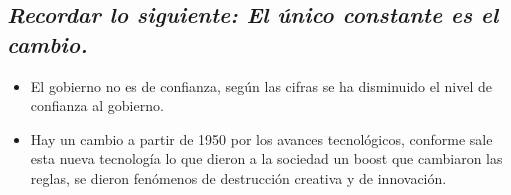 \begin{figure}[htbp]
    \centering
    \caption{}
    \label{}
\end{figure} 
\subsection{\emph{\textbf{Recordar lo siguiente: }El único constante es el cambio.}}
\begin{itemize}
    \item El gobierno no es de confianza, según las cifras se ha disminuido el nivel de confianza al gobierno.
    \item Hay un cambio a partir de 1950 por los avances tecnológicos, conforme sale esta nueva tecnología lo que dieron a la sociedad un boost que cambiaron las reglas, se dieron fenómenos de destrucción creativa y de innovación.
\end{itemize}
